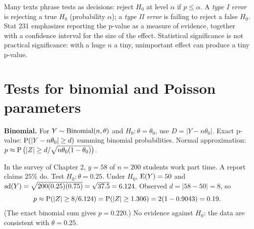\begin{remark}
Many texts phrase tests as decisions: reject $H_0$ at level $\alpha$ if $p\le\alpha$.
A \emph{type I error} is rejecting a true $H_0$ (probability $\alpha$); a \emph{type II
error} is failing to reject a false $H_0$. Stat 231 emphasizes reporting the p-value as a
measure of evidence, together with a confidence interval for the size of the effect.
Statistical significance is not practical significance: with a huge $n$ a tiny,
unimportant effect can produce a tiny p-value.
\end{remark}

\section{Tests for binomial and Poisson parameters}

\textbf{Binomial.} For $Y\sim\operatorname{Binomial}(n,\theta)$ and $H_0:\theta=\theta_0$, use
$D = |Y - n\theta_0|$. Exact p-value: $\operatorname{P}(|Y-n\theta_0|\ge d)$ summing binomial
probabilities. Normal approximation: $p\approx\operatorname{P}\big(|Z|\ge
d/\sqrt{n\theta_0(1-\theta_0)}\big)$.

\begin{example}
In the survey of Chapter 2, $y=58$ of $n=200$ students work part time. A report claims
$25\%$ do. Test $H_0:\theta = 0.25$. Under $H_0$, $\operatorname{E}(Y) = 50$ and $\operatorname{sd}(Y) =
\sqrt{200(0.25)(0.75)} = \sqrt{37.5} = 6.124$. Observed $d = |58-50| = 8$, so
\[
p\approx\operatorname{P}(|Z|\ge 8/6.124) = \operatorname{P}(|Z|\ge 1.306) = 2(1-0.9043) = 0.19.
\]
(The exact binomial sum gives $p = 0.220$.) No evidence against $H_0$: the data are
consistent with $\theta=0.25$.
\end{example}

